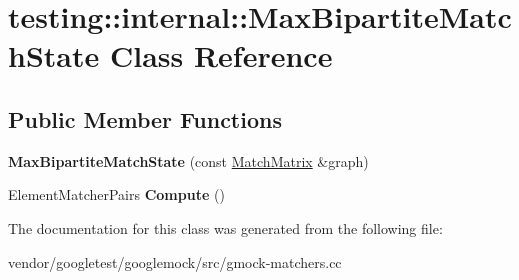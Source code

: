 \hypertarget{classtesting_1_1internal_1_1_max_bipartite_match_state}{}\section{testing\+:\+:internal\+:\+:Max\+Bipartite\+Match\+State Class Reference}
\label{classtesting_1_1internal_1_1_max_bipartite_match_state}
\subsection*{Public Member Functions}
\begin{DoxyCompactItemize}
\item 
\mbox{\label{classtesting_1_1internal_1_1_max_bipartite_match_state_a9d0166d5cc7afd1b741f6c312df72b54}} 
{\bfseries Max\+Bipartite\+Match\+State} (const \mbox{\hyperlink{classtesting_1_1internal_1_1_match_matrix}{Match\+Matrix}} \&graph)
\item 
\mbox{\label{classtesting_1_1internal_1_1_max_bipartite_match_state_af6efab664ee390925b24d023f1368192}} 
Element\+Matcher\+Pairs {\bfseries Compute} ()
\end{DoxyCompactItemize}


The documentation for this class was generated from the following file\+:\begin{DoxyCompactItemize}
\item 
vendor/googletest/googlemock/src/gmock-\/matchers.\+cc\end{DoxyCompactItemize}
